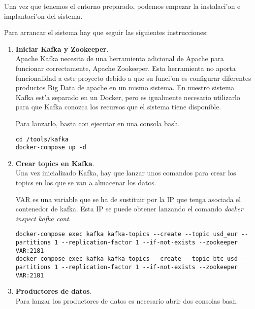 Una vez que tenemos el entorno preparado, podemos empezar la instalaci'on e implantaci'on del sistema. 

Para arrancar el sistema hay que seguir las siguientes instrucciones:

\begin{enumerate}

\item \textbf{Iniciar Kafka y Zookeeper}.\\
Apache Kafka necesita de una herramienta adicional de Apache para funcionar correctamente, Apache Zookeeper. Esta herramienta no aporta funcionalidad a este proyecto debido a que su funci'on es configurar diferentes productos Big Data de apache en un mismo sistema. En nuestro sistema Kafka est'a separado en un Docker, pero es igualmente necesario utilizarlo para que Kafka conozca los recursos que el sistema tiene disponible.

Para lanzarlo, basta con ejecutar en una consola bash.

\begin{lstlisting}
cd /tools/kafka
docker-compose up -d
\end{lstlisting}

\item \textbf{Crear topics en Kafka}.\\
Una vez inicializado Kafka, hay que lanzar unos comandos para crear los topics en los que se van a almacenar los datos. 


VAR es una variable que se ha de sustituir por la IP que tenga asociada el contenedor de kafka. Esta IP se puede obtener lanzando el comando \textit{docker inspect kafka \textunderscore cont}. 

\begin{lstlisting}
docker-compose exec kafka kafka-topics --create --topic usd_eur --partitions 1 --replication-factor 1 --if-not-exists --zookeeper VAR:2181
docker-compose exec kafka kafka-topics --create --topic btc_usd --partitions 1 --replication-factor 1 --if-not-exists --zookeeper VAR:2181
\end{lstlisting}


\item \textbf{Productores de datos}.\\
Para lanzar los productores de datos es necesario abrir dos consolas bash.


\end{enumerate}
